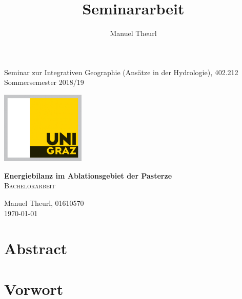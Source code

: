\documentclass[12pt,a4paper]{article}
\title{Seminararbeit}
\author{Manuel Theurl}
\begin{document}

\begin{titlepage}

\begin{flushright}
\begin{normalsize}
Seminar zur Integrativen Geographie (Ansätze in der Hydrologie), 402.212
\\
Sommersemester 2018/19
\end{normalsize}
\end{flushright}

\vspace{5cm}

\begin{center}
\includegraphics[width=0.3\textwidth]{logo_uni_graz.jpg}

\vspace{1.5cm}

\textbf{\Large Energiebilanz im Ablationsgebiet der Pasterze}\\
\vspace{2cm}
\textsc{\large {Bachelorarbeit}}\\[4cm]
\end{center}

\vspace{2cm}

\begin{flushright}
Manuel Theurl, 01610570\\
\today
\end{flushright}

\end{titlepage} 

\pagebreak
\ofoot{{\small \pagemark}}
\section*{Abstract}

\pagebreak
\section*{Vorwort}
\end{document}
